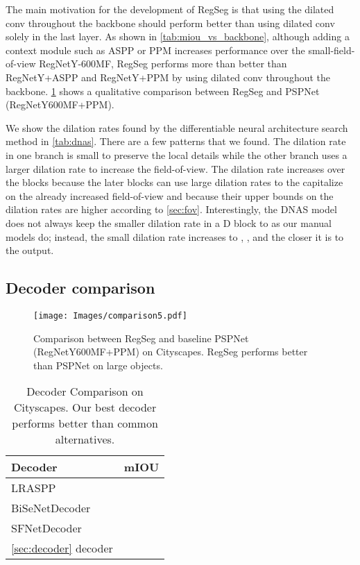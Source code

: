 \documentclass[10pt,twocolumn,letterpaper]{article}
\begin{document}
The main motivation for the development of RegSeg is that using the dilated conv throughout the backbone should perform better than using dilated conv solely in the last layer. As shown in \cref{tab:miou_vs_backbone}, although adding a context module such as ASPP\cite{deeplabv3} or PPM\cite{pspnet} increases performance over the small-field-of-view RegNetY-600MF, RegSeg performs more than  better than RegNetY+ASPP and RegNetY+PPM by using dilated conv throughout the backbone. \cref{fig:cityscapes_comparison} shows a qualitative comparison between RegSeg and PSPNet (RegNetY600MF+PPM).

We show the dilation rates found by the differentiable neural architecture search method in \cref{tab:dnas}. There are a few patterns that we found. The dilation rate in one branch is small to preserve the local details while the other branch uses a larger dilation rate to increase the field-of-view. The dilation rate increases over the blocks because the later blocks can use large dilation rates to the capitalize on the already increased field-of-view and because their upper bounds on the dilation rates are higher according to \cref{sec:fov}. Interestingly, the DNAS model does not always keep the smaller dilation rate in a D block to  as our manual models do; instead, the small dilation rate increases to , , and  the closer it is to the output.

\subsection{Decoder comparison}

\begin{figure}
  \centering
    \texttt{[image: Images/comparison5.pdf]}
   \caption{Comparison between RegSeg and baseline PSPNet (RegNetY600MF+PPM) on Cityscapes. RegSeg performs better than PSPNet on large objects.}
   \label{fig:cityscapes_comparison}
\end{figure}

\label{sec:decoderComparison}
\begin{table}
  \centering
  \begin{tabular}{l|c}
    \toprule
    Decoder &mIOU\\
    \midrule
    LRASPP\cite{mobilenetv32019} & \\
    BiSeNetDecoder\cite{bisenetv1}& \\
    SFNetDecoder\cite{sfnet} &\\
    \cref{sec:decoder} decoder& \\
    \bottomrule
  \end{tabular}
  \caption{Decoder Comparison on Cityscapes. Our best decoder performs better than common alternatives.}
  \label{tab:decoderComparison}
\end{table}
\end{document}

